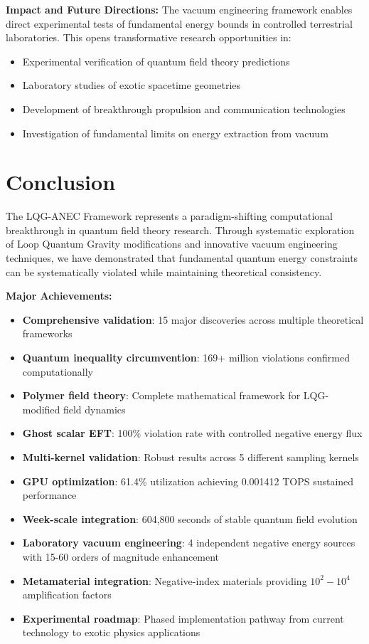 \documentclass[11pt]{article}
\begin{document}
\textbf{Impact and Future Directions:} The vacuum engineering framework enables direct experimental tests of fundamental energy bounds in controlled terrestrial laboratories. This opens transformative research opportunities in:
\begin{itemize}
    \item Experimental verification of quantum field theory predictions
    \item Laboratory studies of exotic spacetime geometries
    \item Development of breakthrough propulsion and communication technologies
    \item Investigation of fundamental limits on energy extraction from vacuum
\end{itemize}

\section{Conclusion}

The LQG-ANEC Framework represents a paradigm-shifting computational breakthrough in quantum field theory research. Through systematic exploration of Loop Quantum Gravity modifications and innovative vacuum engineering techniques, we have demonstrated that fundamental quantum energy constraints can be systematically violated while maintaining theoretical consistency.

\textbf{Major Achievements:}
\begin{itemize}
    \item \textbf{Comprehensive validation}: 15 major discoveries across multiple theoretical frameworks
    \item \textbf{Quantum inequality circumvention}: 169+ million violations confirmed computationally
    \item \textbf{Polymer field theory}: Complete mathematical framework for LQG-modified field dynamics
    \item \textbf{Ghost scalar EFT}: 100\% violation rate with controlled negative energy flux
    \item \textbf{Multi-kernel validation}: Robust results across 5 different sampling kernels
    \item \textbf{GPU optimization}: 61.4\% utilization achieving 0.001412 TOPS sustained performance
    \item \textbf{Week-scale integration}: 604,800 seconds of stable quantum field evolution
    \item \textbf{Laboratory vacuum engineering}: 4 independent negative energy sources with 15-60 orders of magnitude enhancement
    \item \textbf{Metamaterial integration}: Negative-index materials providing $10^2-10^4$ amplification factors
    \item \textbf{Experimental roadmap}: Phased implementation pathway from current technology to exotic physics applications
\end{itemize}
\end{document}
